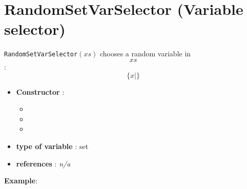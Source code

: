 \section{RandomSetVarSelector (Variable selector)}\label{randomvarset:randomvarsetvarselector}\hypertarget{randomvarset:randomvarsetvarselector}{}
\begin{notedef}
  \texttt{RandomSetVarSelector}$(xs)$ chooses a random variable in $$xs$$:
$$\{x | \}$$
\end{notedef}

\begin{itemize}
	\item \textbf{Constructor} : 
	\begin{itemize}
	\item {}
	\item {}
	\item {}
	\end{itemize}	
	\item \textbf{type of variable} : set
	\item \textbf{references} : \emph{n/a}
\end{itemize}

\textbf{Example}:
%

